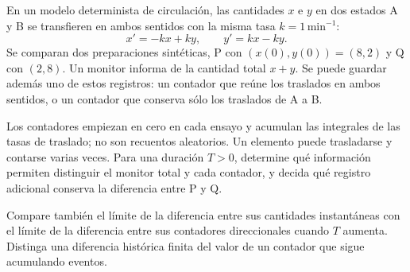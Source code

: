 En un modelo determinista de circulación, las cantidades \(x\) e \(y\) en dos estados A y B se transfieren en ambos sentidos con la misma tasa \(k=1\,\mathrm{min}^{-1}\):
\[
x'=-kx+ky,\qquad y'=kx-ky.
\]
Se comparan dos preparaciones sintéticas, P con \((x(0),y(0))=(8,2)\) y Q con \((2,8)\). Un monitor informa de la cantidad total \(x+y\). Se puede guardar además uno de estos registros: un contador que reúne los traslados en ambos sentidos, o un contador que conserva sólo los traslados de A a B.

Los contadores empiezan en cero en cada ensayo y acumulan las integrales de las tasas de traslado; no son recuentos aleatorios. Un elemento puede trasladarse y contarse varias veces. Para una duración \(T>0\), determine qué información permiten distinguir el monitor total y cada contador, y decida qué registro adicional conserva la diferencia entre P y Q.

Compare también el límite de la diferencia entre sus cantidades instantáneas con el límite de la diferencia entre sus contadores direccionales cuando \(T\) aumenta. Distinga una diferencia histórica finita del valor de un contador que sigue acumulando eventos.
